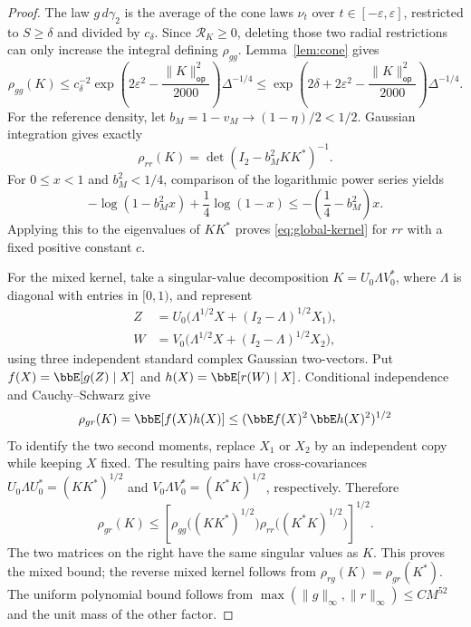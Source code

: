 \documentclass[11pt,reqno]{amsart}
\begin{document}
\begin{proof}
The law $g\,d\gamma_2$ is the average of the cone laws $\nu_t$ over $t\in[-\varepsilon,\varepsilon]$, restricted to $S\ge\delta$ and divided by $c_\delta$. Since $\mathcal R_K\ge0$, deleting those two radial restrictions can only increase the integral defining $\rho_{gg}$. Lemma~\ref{lem:cone} gives
\[
 \rho_{gg}(K)\le c_\delta^{-2}
 \exp\left(2\varepsilon^2-\frac{\|K\|_{\mathsf{op}}^2}{2000}\right)\Delta^{-1/4}
 \le\exp\left(2\delta+2\varepsilon^2-\frac{\|K\|_{\mathsf{op}}^2}{2000}\right)\Delta^{-1/4}.
\]
For the reference density, let $b_M=1-v_M\to(1-\eta)/2<1/2$. Gaussian integration gives exactly
\begin{equation}\label{eq:reference-kernel}
 \rho_{rr}(K)=\det(I_2-b_M^2KK^*)^{-1}.
\end{equation}
For $0\le x<1$ and $b_M^2<1/4$, comparison of the logarithmic power series yields
\[
 -\log(1-b_M^2x)+\frac14\log(1-x)
 \le-\left(\frac14-b_M^2\right)x.
\]
Applying this to the eigenvalues of $KK^*$ proves \eqref{eq:global-kernel} for $rr$ with a fixed positive constant $c$.

For the mixed kernel, take a singular-value decomposition $K=U_0\Lambda V_0^*$, where $\Lambda$ is diagonal with entries in $[0,1)$, and represent
\begin{align*}
 Z&=U_0\bigl(\Lambda^{1/2}X+(I_2-\Lambda)^{1/2}X_1\bigr),\\
 W&=V_0\bigl(\Lambda^{1/2}X+(I_2-\Lambda)^{1/2}X_2\bigr),
\end{align*}
using three independent standard complex Gaussian two-vectors. Put $f(X)=\bbE[g(Z)\mid X]$ and $h(X)=\bbE[r(W)\mid X]$. Conditional independence and Cauchy--Schwarz give
\[
    \rho_{gr}(K)=\bbE[f(X)h(X)]\le(\bbE f(X)^2\,\bbE h(X)^2)^{1/2}
\]
To identify the two second moments, replace $X_1$ or $X_2$ by an independent copy while keeping $X$ fixed. The resulting pairs have cross-covariances $U_0\Lambda U_0^*=(KK^*)^{1/2}$ and $V_0\Lambda V_0^*=(K^*K)^{1/2}$, respectively. Therefore
\[
 \rho_{gr}(K)\le
 \left[\rho_{gg}\bigl((KK^*)^{1/2}\bigr)
       \rho_{rr}\bigl((K^*K)^{1/2}\bigr)\right]^{1/2}.
\]
The two matrices on the right have the same singular values as $K$. This proves the mixed bound; the reverse mixed kernel follows from $\rho_{rg}(K)=\rho_{gr}(K^*)$. The uniform polynomial bound follows from $\max(\|g\|_\infty,\|r\|_\infty)\le CM^{52}$ and the unit mass of the other factor.


\end{proof}
\end{document}
